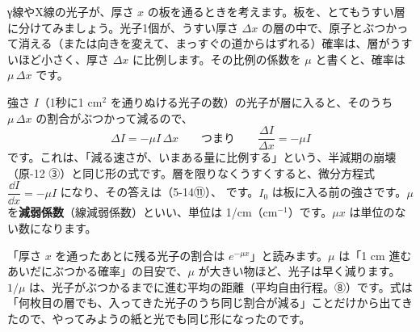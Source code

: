\begin{phmodel}[放射線と物のやりとり]
\end{phmodel}


\label{ph:原-13:sec3}
γ線やX線の光子が、厚さ $x$ の板を通るときを考えます。板を、とてもうすい層に分けてみましょう。光子1個が、うすい厚さ $\Delta x$ の層の中で、原子とぶつかって消える（または向きを変えて、まっすぐの道からはずれる）確率は、層がうすいほど小さく、厚さ $\Delta x$ に比例します。その比例の係数を $\mu$ と書くと、確率は $\mu\,\Delta x$ です。

強さ $I$（1秒に1 cm$^2$ を通りぬける光子の数）の光子が層に入ると、そのうち $\mu\,\Delta x$ の割合がぶつかって減るので、
\[ \Delta I=-\mu I\,\Delta x \qquad\text{つまり}\qquad \frac{\Delta I}{\Delta x}=-\mu I \]
です。これは、「減る速さが、いまある量に比例する」という、半減期の崩壊（原-12 ③）と同じ形の式です。層を限りなくうすくすると、微分方程式 $\dfrac{\dd I}{\dd x}=-\mu I$ になり、その答えは（5-14⑪）、
\label{ph:原-13:gensui}です。$I_0$ は板に入る前の強さです。$\mu$ を\textbf{減弱係数}（線減弱係数）といい、単位は 1/cm（cm$^{-1}$）です。$\mu x$ は単位のない数になります。

\begin{phflow}
\end{phflow}

\begin{phyomi}[$I=I_0e^{-\mu x}$]
「厚さ $x$ を通ったあとに残る光子の割合は $e^{-\mu x}$」と読みます。$\mu$ は「1 cm 進むあいだにぶつかる確率」の目安で、$\mu$ が大きい物ほど、光子は早く減ります。$1/\mu$ は、光子がぶつかるまでに進む平均の距離（平均自由行程。⑧）です。式は「何枚目の層でも、入ってきた光子のうち同じ割合が減る」ことだけから出てきたので、やってみようの紙と光でも同じ形になったのです。
\end{phyomi}

